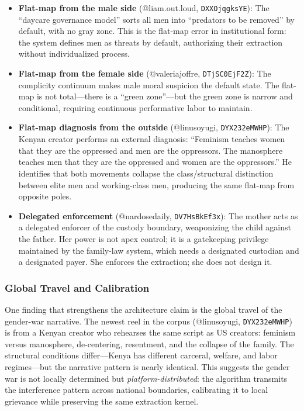 \documentclass[12pt]{article}
\begin{document}
\begin{itemize}
  \item \textbf{Flat-map from the male side} (@liam.out.loud, \texttt{DXXOjqgksYE}): The ``daycare governance model'' sorts all men into ``predators to be removed'' by default, with no gray zone. This is the flat-map error in institutional form: the system defines men as threats by default, authorizing their extraction without individualized process.
  
  \item \textbf{Flat-map from the female side} (@valeriajoffre, \texttt{DTjSC0EjF2Z}): The complicity continuum makes male moral suspicion the default state. The flat-map is not total---there is a ``green zone''---but the green zone is narrow and conditional, requiring continuous performative labor to maintain.
  
  \item \textbf{Flat-map diagnosis from the outside} (@linusoyugi, \texttt{DYX232eMWHP}): The Kenyan creator performs an external diagnosis: ``Feminism teaches women that they are the oppressed and men are the oppressors. The manosphere teaches men that they are the oppressed and women are the oppressors.'' He identifies that both movements collapse the class/structural distinction between elite men and working-class men, producing the same flat-map from opposite poles.
  
  \item \textbf{Delegated enforcement} (@nardosedaily, \texttt{DV7HsBkEf3x}): The mother acts as a delegated enforcer of the custody boundary, weaponizing the child against the father. Her power is not apex control; it is a gatekeeping privilege maintained by the family-law system, which needs a designated custodian and a designated payer. She enforces the extraction; she does not design it.
\end{itemize}

\subsubsection{Global Travel and Calibration}

One finding that strengthens the architecture claim is the global travel of the gender-war narrative. The newest reel in the corpus (@linusoyugi, \texttt{DYX232eMWHP}) is from a Kenyan creator who rehearses the same script as US creators: feminism versus manosphere, de-centering, resentment, and the collapse of the family. The structural conditions differ---Kenya has different carceral, welfare, and labor regimes---but the narrative pattern is nearly identical. This suggests the gender war is not locally determined but \textit{platform-distributed}: the algorithm transmits the interference pattern across national boundaries, calibrating it to local grievance while preserving the same extraction kernel.
\end{document}
